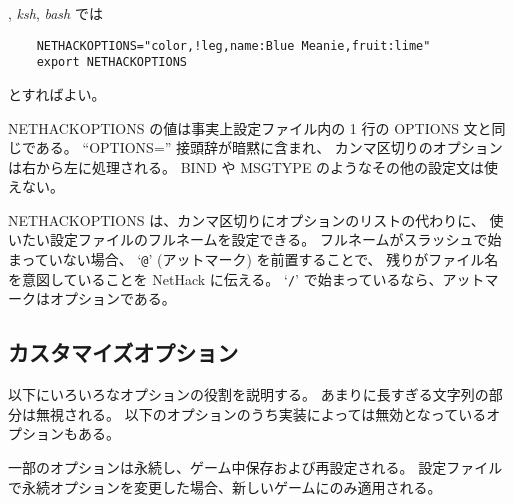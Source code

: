, {\it ksh}, {\it bash} では
\begin{verbatim}
    NETHACKOPTIONS="color,!leg,name:Blue Meanie,fruit:lime"
    export NETHACKOPTIONS
\end{verbatim}

とすればよい。

NETHACKOPTIONS の値は事実上設定ファイル内の
1 行の OPTIONS 文と同じである。
``OPTIONS='' 接頭辞が暗黙に含まれ、
カンマ区切りのオプションは右から左に処理される。
BIND や MSGTYPE のようなその他の設定文は使えない。

NETHACKOPTIONS は、カンマ区切りにオプションのリストの代わりに、
使いたい設定ファイルのフルネームを設定できる。
フルネームがスラッシュで始まっていない場合、
`{\tt @}' (アットマーク) を前置することで、
残りがファイル名を意図していることを NetHack に伝える。
`{\tt /}' で始まっているなら、アットマークはオプションである。

\subsection*{カスタマイズオプション}

以下にいろいろなオプションの役割を説明する。
あまりに長すぎる文字列の部分は無視される。
以下のオプションのうち実装によっては無効となっているオプションもある。

一部のオプションは永続し、ゲーム中保存および再設定される。
設定ファイルで永続オプションを変更した場合、新しいゲームにのみ適用される。

